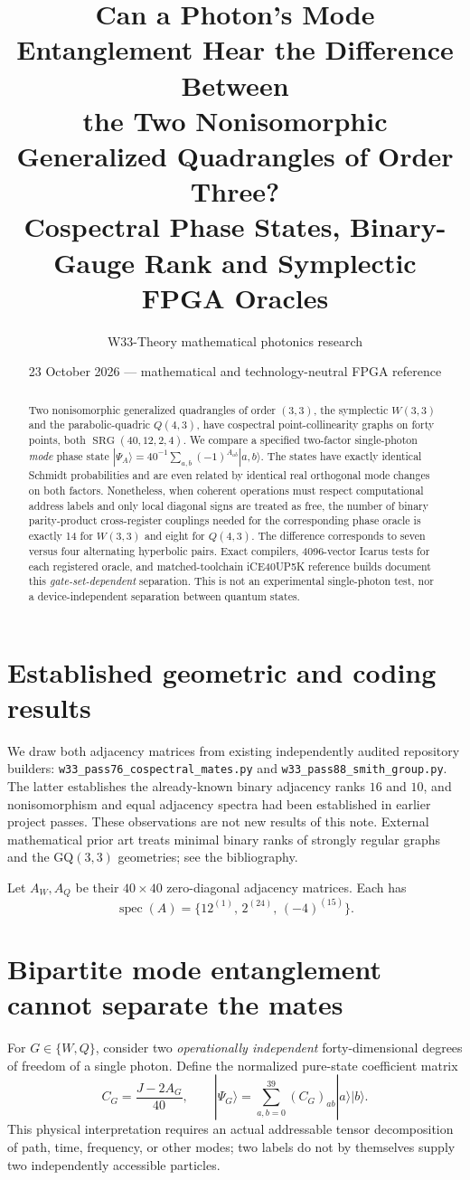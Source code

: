 \documentclass[10pt]{article}
\title{Can a Photon's Mode Entanglement Hear the Difference Between\\
the Two Nonisomorphic Generalized Quadrangles of Order Three?\\
\large Cospectral Phase States, Binary-Gauge Rank and Symplectic FPGA Oracles}
\author{W33-Theory mathematical photonics research}
\date{23 October 2026 --- mathematical and technology-neutral FPGA reference}
\begin{document}
\maketitle
\begin{abstract}
Two nonisomorphic generalized quadrangles of order $(3,3)$,
the symplectic $W(3,3)$ and the parabolic-quadric $Q(4,3)$,
have cospectral point-collinearity graphs on forty points,
both $\operatorname{SRG}(40,12,2,4)$. We compare a specified
two-factor single-photon \emph{mode} phase state
$|\Psi_A\rangle=40^{-1}\sum_{a,b}(-1)^{A_{ab}}|a,b\rangle$.
The states have exactly identical Schmidt probabilities and
are even related by identical real orthogonal mode changes on
both factors. Nonetheless, when coherent operations must
respect computational address labels and only local diagonal
signs are treated as free, the number of binary parity-product
cross-register couplings needed for the corresponding phase
oracle is exactly 14 for $W(3,3)$ and eight for $Q(4,3)$.
The difference corresponds to seven versus four alternating
hyperbolic pairs. Exact compilers, 4096-vector Icarus tests
for each registered oracle, and matched-toolchain
iCE40UP5K reference builds document this \emph{gate-set-dependent}
separation. This is not an experimental single-photon test,
nor a device-independent separation between quantum states.
\end{abstract}
\section{Established geometric and coding results}
We draw both adjacency matrices from existing independently
audited repository builders:
\texttt{w33\_pass76\_cospectral\_mates.py} and
\texttt{w33\_pass88\_smith\_group.py}.
The latter establishes the already-known binary adjacency
ranks $16$ and $10$, and nonisomorphism and equal adjacency
spectra had been established in earlier project passes.
These observations are not new results of this note.
External mathematical prior art treats minimal binary ranks
of strongly regular graphs and the GQ$(3,3)$ geometries;
see the bibliography.

Let $A_W,A_Q$ be their $40\times40$ zero-diagonal
adjacency matrices. Each has
\[
\operatorname{spec}(A)=
\{12^{(1)},\,2^{(24)},\,(-4)^{(15)}\}.
\]

\section{Bipartite mode entanglement cannot separate the mates}
For $G\in\{W,Q\}$, consider two \emph{operationally
independent} forty-dimensional degrees of freedom of a
single photon. Define the normalized pure-state coefficient
matrix
\[
C_G=\frac{J-2A_G}{40},\qquad
|\Psi_G\rangle=\sum_{a,b=0}^{39}(C_G)_{ab}|a\rangle|b\rangle.
\]
This physical interpretation requires an actual addressable
tensor decomposition of path, time, frequency, or other modes;
two labels do not by themselves supply two independently
accessible particles.
\end{document}
